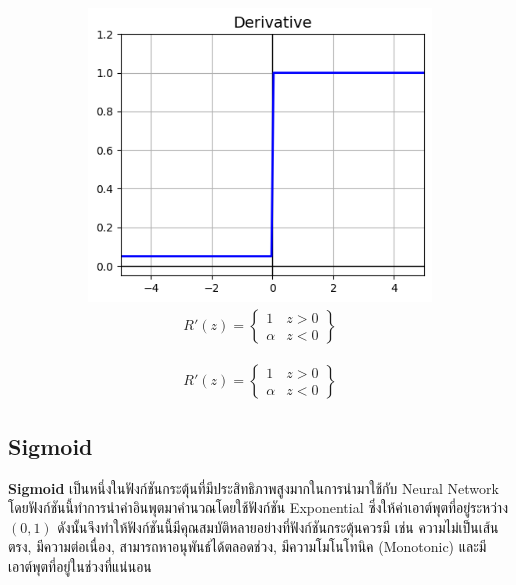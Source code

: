 \begin{figure}[H]
\begin{subfigure}{0.5\textwidth}
      \centering
      \includegraphics[width=0.9\linewidth]{fig/actfunc_leakyrelu_der.png}
      \caption{%
          \begin{equation}
              \begin{split}R'(z) =
                  \begin{Bmatrix}
                      1      & z>0 \\
                      \alpha & z<0
                  \end{Bmatrix}
              \end{split}
          \end{equation}
      }
      \label{fig:actfunc_leakyrelu_der}
  \end{subfigure}
\end{figure}

\subsection{Sigmoid}

\textbf{Sigmoid}\autocite{wilson1972} เป็นหนึ่งในฟังก์ชันกระตุ้นที่มีประสิทธิภาพสูงมากในการนำมาใช้กับ Neural Network โดยฟังก์ชันนี้ทำการนำค่าอินพุตมาคำนวณโดยใช้ฟังก์ชัน Exponential ซึ่งให้ค่าเอาต์พุตที่อยู่ระหว่าง $(0, 1)$ ดังนั้นจึงทำให้ฟังก์ชันนี้มีคุณสมบัติหลายอย่างที่ฟังก์ชันกระตุ้นควรมี เช่น ความไม่เป็นเส้นตรง, มีความต่อเนื่อง, สามารถหาอนุพันธ์ได้ตลอดช่วง, มีความโมโนโทนิค (Monotonic) และมีเอาต์พุตที่อยู่ในช่วงที่แน่นอน


